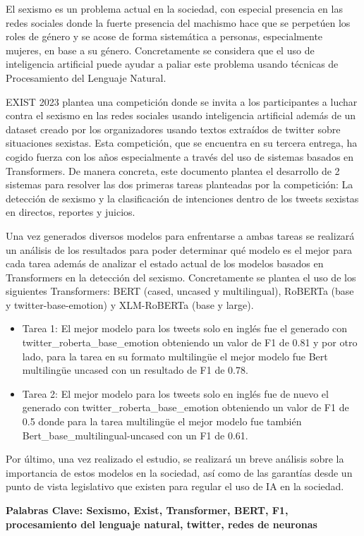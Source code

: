 El sexismo es un problema actual en la sociedad, con especial presencia en las redes sociales donde la fuerte presencia del machismo hace que se perpetúen los roles de género y se acose de forma sistemática a personas, especialmente mujeres, en base a su género. Concretamente se considera que el uso de inteligencia artificial puede ayudar a paliar este problema usando técnicas de Procesamiento del Lenguaje Natural.

EXIST 2023 plantea una competición donde se invita a los participantes a luchar contra el sexismo en las redes sociales usando inteligencia artificial además de un dataset creado por los organizadores usando textos extraídos de twitter sobre situaciones sexistas. Esta competición, que se encuentra en su tercera entrega, ha cogido fuerza con los años especialmente a través del uso de sistemas basados en Transformers. De manera concreta, este documento plantea el desarrollo de 2 sistemas para resolver las dos primeras tareas planteadas por la competición: La detección de sexismo y la clasificación de intenciones dentro de los tweets sexistas en directos, reportes y juicios. 

Una vez generados diversos modelos para enfrentarse a ambas tareas se realizará un análisis de los resultados para poder determinar qué modelo es el mejor para cada tarea además de analizar el estado actual de los modelos basados en Transformers en la detección del sexismo. Concretamente se plantea el uso de los siguientes Transformers: BERT (cased, uncased y multilingual), RoBERTa (base y twitter-base-emotion) y XLM-RoBERTa (base y large). 

\begin{itemize}
    \item Tarea 1: El mejor modelo para los tweets solo en inglés fue el generado con twitter\_roberta\_base\_emotion obteniendo un valor de F1 de 0.81 y por otro lado, para la tarea en su formato multilingüe el mejor modelo fue Bert multilingüe uncased con un resultado de F1 de 0.78.
    \item Tarea 2: El mejor modelo para los tweets solo en inglés fue de nuevo el generado con twitter\_roberta\_base\_emotion obteniendo un valor de F1 de 0.5 donde para la tarea multilingüe el mejor modelo fue también Bert\_base\_multilingual-uncased con un F1 de 0.61.
\end{itemize}

Por último, una vez realizado el estudio, se realizará un breve análisis sobre la importancia de estos modelos en la sociedad, así como de las garantías desde un punto de vista legislativo que existen para regular el uso de IA en la sociedad.

\textbf{Palabras Clave: Sexismo, Exist, Transformer, BERT, F1, procesamiento del lenguaje natural, twitter, redes de neuronas}
